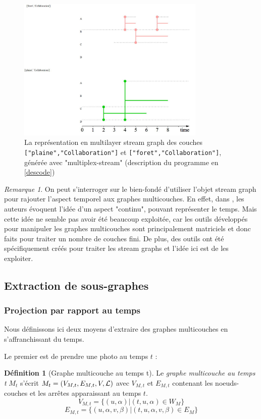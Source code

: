 \documentclass[11pt,a4paper]{article}
\theoremstyle{definition}
\newtheorem{defn}{Définition}
\theoremstyle{remark}
\newtheorem{rmq}{Remarque}
\theoremstyle{remark}
\begin{document}
	\begin{figure}[H]
		\centering
		\includegraphics[width=0.8\textwidth]{exMultiStream.JPG}
		\caption{La représentation en multilayer stream graph des couches \texttt{["plaine","Collaboration"]} et \texttt{["foret","Collaboration"]}, générée avec "multiplex-stream" (description du programme en \cref{descode})}
		\label{exstgm}
	\end{figure}
	
	\begin{rmq}
		On peut s'interroger sur le bien-fondé d'utiliser l'objet stream graph pour rajouter l'aspect temporel aux graphes multicouches. En effet, dans \cite{mlkiv}, les auteurs évoquent l'idée d'un aspect "continu", pouvant représenter le temps. Mais cette idée ne semble pas avoir été beaucoup exploitée, car les outils développés pour manipuler les graphes multicouches sont principalement matriciels et donc faits pour traiter un nombre de couches fini. De plus, des outils ont été spécifiquement créés pour traiter les stream graphs et l'idée ici est de les exploiter.
	
	\end{rmq}

\subsection{Extraction de sous-graphes}
\label{sousgraphes}
\subsubsection{Projection par rapport au temps}
	Nous définissons ici deux moyens d'extraire des graphes multicouches en s'affranchissant du temps.
	
	Le premier est de \og prendre une photo \fg{} au temps $t$ :
	\begin{defn}[Graphe multicouche au temps t]
   	Le {\em graphe multicouche au temps t} $M_t$ s'écrit $M_t = (V_{M,t}, E_{M,t},V,{\cal L})$ avec $V_{M,t}$ et $E_{M,t}$ contenant les noeuds-couches et les arrêtes apparaissant au temps $t$.
   	$$ V_{M,t} = \{ (u,\alpha) | (t,u,\alpha) \in W_M\} $$
   	$$ E_{M,t} = \{(u,\alpha,v,\beta) | (t,u,\alpha,v,\beta) \in E_M\}$$

   \end{defn}
\end{document}
